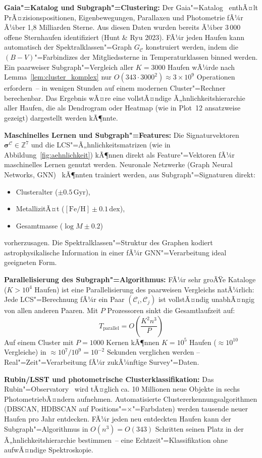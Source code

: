 ﻿\documentclass[a4paper,12pt]{article}
\theoremstyle{definition}
\begin{document}
\textbf{Gaia"=Katalog und Subgraph"=Clustering:}
Der Gaia"=Katalog~\cite{prusti2016} enthÃ¤lt PrÃ¤zisionspositionen,
Eigenbewegungen, Parallaxen und Photometrie fÃ¼r Ã¼ber 1,8 Milliarden Sterne.
Aus diesen Daten wurden bereits Ã¼ber 3\,000 offene Sternhaufen identifiziert
(Hunt \& Ryu 2023). FÃ¼r jeden Haufen kann automatisch der
Spektralklassen"=Graph $G_{\mathcal{C}}$ konstruiert werden, indem die
$(B-V)$"=Farbindizes der Mitgliedssterne in Temperaturklassen binned werden.
Ein paarweiser Subgraph"=Vergleich aller $K = 3000$ Haufen
wÃ¼rde nach Lemma~\ref{lem:cluster_komplex} nur
$O(343 \cdot 3000^2) \approx 3 \times 10^9$ Operationen erfordern~--
in wenigen Stunden auf einem modernen Cluster"=Rechner berechenbar.
Das Ergebnis wÃ¤re eine vollstÃ¤ndige Ã„hnlichkeitshierarchie aller Haufen,
die als Dendrogram oder Heatmap (wie in Plot~12 ansatzweise gezeigt)
dargestellt werden kÃ¶nnte.

\textbf{Maschinelles Lernen und Subgraph"=Features:}
Die Signaturvektoren $\boldsymbol{\sigma}^{\mathcal{C}} \in \mathbb{Z}^7$
und die LCS"=Ã„hnlichkeitsmatrizen (wie in Abbildung~\ref{fig:aehnlichkeit})
kÃ¶nnen direkt als Feature"=Vektoren fÃ¼r maschinelles Lernen genutzt werden.
Neuronale Netzwerke (Graph Neural Networks, GNN)~\cite{kipf2017} kÃ¶nnten
trainiert werden, aus Subgraph"=Signaturen direkt:
\begin{itemize}
    \item Clusteralter ($\pm 0.5\,\text{Gyr}$),
    \item MetallizitÃ¤t ($[\text{Fe/H}] \pm 0.1\,\text{dex}$),
    \item Gesamtmasse ($\log M \pm 0.2$)
\end{itemize}
vorherzusagen. Die Spektralklassen"=Struktur des Graphen kodiert
astrophysikalische Information in einer fÃ¼r GNN"=Verarbeitung
ideal geeigneten Form.

\textbf{Parallelisierung des Subgraph"=Algorithmus:}
FÃ¼r sehr groÃŸe Kataloge ($K > 10^4$ Haufen) ist eine Parallelisierung
des paarweisen Vergleichs natÃ¼rlich: Jede LCS"=Berechnung fÃ¼r ein Paar
$(\mathcal{C}_i, \mathcal{C}_j)$ ist vollstÃ¤ndig unabhÃ¤ngig von allen
anderen Paaren. Mit $P$ Prozessoren sinkt die Gesamtlaufzeit auf:
\[
    T_{\text{parallel}} = O\!\left(\frac{K^2 n^3}{P}\right)
\]
Auf einem Cluster mit $P = 1000$ Kernen kÃ¶nnen $K = 10^5$ Haufen
($\approx 10^{10}$ Vergleiche) in $\approx 10^7 / 10^9 = 10^{-2}$ Sekunden
verglichen werden -- Real"=Zeit"=Verarbeitung fÃ¼r zukÃ¼nftige Survey"=Daten.

\textbf{Rubin/LSST und photometrische Clusterklassifikation:}
Das Rubin"=Observatory~\cite{ivezic2019} wird tÃ¤glich ca. 10 Millionen
neue Objekte in sechs PhotometriebÃ¤ndern aufnehmen. Automatisierte
Clustererkennungsalgorithmen (DBSCAN, HDBSCAN auf Positions"=$\times$"=Farbdaten)
werden tausende neuer Haufen pro Jahr entdecken. FÃ¼r jeden neu entdeckten Haufen
kann der Subgraph"=Algorithmus in $O(n^3) = O(343)$ Schritten seinen
Platz in der Ã„hnlichkeitshierarchie bestimmen~-- eine Echtzeit"=Klassifikation
ohne aufwÃ¤ndige Spektroskopie.
\end{document}
